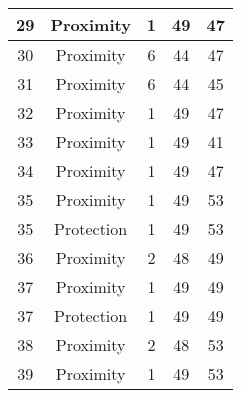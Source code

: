 \documentclass[results.tex]{subfiles}
\begin{document}
\begin{center}
\begin{tabular}{| c || c | c | c | c |}
            \hline
            29                      & Proximity                    & 1                      & 49                      & 47                   \\
            \hline
            30                      & Proximity                    & 6                      & 44                      & 47                   \\
            \hline
            31                      & Proximity                    & 6                      & 44                      & 45                   \\
            \hline
            32                      & Proximity                    & 1                      & 49                      & 47                   \\
            \hline
            33                      & Proximity                    & 1                      & 49                      & 41                   \\
            \hline
            34                      & Proximity                    & 1                      & 49                      & 47                   \\
            \hline
            35                      & Proximity                    & 1                      & 49                      & 53                   \\
            \hline
            35                      & Protection                   & 1                      & 49                      & 53                   \\
            \hline
            36                      & Proximity                    & 2                      & 48                      & 49                   \\
            \hline
            37                      & Proximity                    & 1                      & 49                      & 49                   \\
            \hline
            37                      & Protection                   & 1                      & 49                      & 49                   \\
            \hline
            38                      & Proximity                    & 2                      & 48                      & 53                   \\
            \hline
            39                      & Proximity                    & 1                      & 49                      & 53                   \\

\end{tabular}
\end{center}
\end{document}
